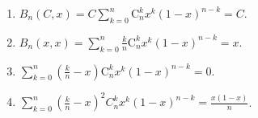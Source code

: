 \documentclass[../../main.tex]{subfiles}
\begin{document}
\begin{lemma}\label{lemma:一些常见函数的Bernstein多项式}
\begin{enumerate}
\item $B_n(C,x)=C\sum_{k=0}^n{\mathrm{C}_{n}^{k}x^k\left( 1-x \right) ^{n-k}}=C.$

\item $B_n(x,x)=\sum_{k=0}^n{\frac{k}{n}\mathrm{C}_{n}^{k}x^k\left( 1-x \right) ^{n-k}}=x.$

\item $\sum_{k=0}^n{\left( \frac{k}{n}-x \right) \mathrm{C}_{n}^{k}x^k\left( 1-x \right) ^{n-k}}=0.$

\item $\sum_{k=0}^n{\left( \frac{k}{n}-x \right) ^2C_{n}^{k}x^k\left( 1-x \right) ^{n-k}}=\frac{x(1-x)}{n}$.
\end{enumerate}
\end{lemma}
\end{document}
